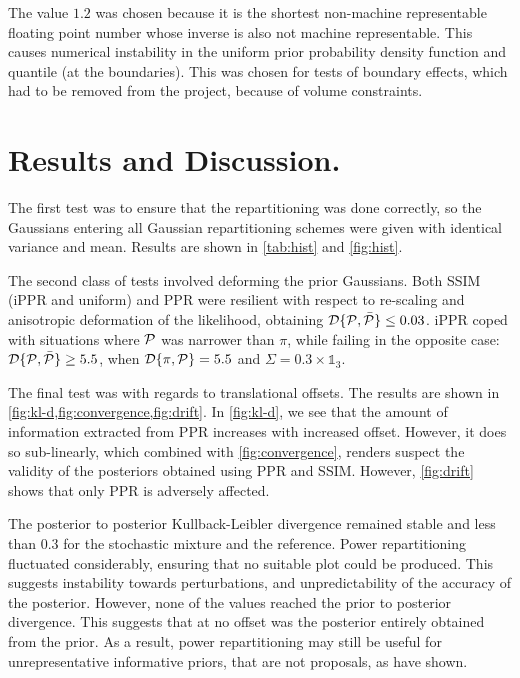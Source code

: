 \documentclass[usenatbib]{mnras}
\begin{document}
The value \(1.2\) was chosen because it is the shortest non-machine
representable floating point number whose inverse is also not machine
representable. This causes numerical instability in the uniform prior
probability density function and quantile (at the boundaries). This
was chosen for tests of boundary effects, which had to be removed from
the project, because of volume constraints. 

\section{Results and Discussion.}\label{sec:results}
The first test was to ensure that the repartitioning was done
correctly, so the Gaussians entering all Gaussian repartitioning
schemes were given with identical variance and mean. Results are shown
in \cref{tab:hist} and \cref{fig:hist}.


The second class of tests involved deforming the prior Gaussians.
Both SSIM (iPPR and uniform) and PPR were resilient with respect to
re-scaling and anisotropic deformation of the likelihood, obtaining
${\cal D}\{ {\cal P}, \bar{\cal P}\} \leq 0.03$. iPPR coped with
situations where ${\cal P}$ was narrower than $\pi$, while failing in
the opposite case: ${\cal D}\{ {\cal P}, \bar{\cal P}\} \geq 5.5$,
when ${\cal D}\{ \pi, {\cal P} \} = 5.5$ and
$\Sigma = 0.3 \times \mathds{1}_{3}$.

The final test was with regards to translational offsets. The results
are shown in \cref{fig:kl-d,fig:convergence,fig:drift}. In
\cref{fig:kl-d}, we see that the amount of information extracted from
PPR increases with increased offset. However, it does so sub-linearly,
which combined with \cref{fig:convergence}, renders suspect the
validity of the posteriors obtained using PPR and SSIM. However,
\cref{fig:drift} shows that only PPR is adversely affected.

The posterior to posterior Kullback-Leibler divergence remained stable
and less than \(0.3\) for the stochastic mixture and the
reference. Power repartitioning fluctuated considerably, ensuring that
no suitable plot could be produced. This suggests instability towards
perturbations, and unpredictability of the accuracy of the
posterior. However, none of the values reached the prior to posterior
divergence. This suggests that at no offset was the posterior entirely
obtained from the prior. As a result, power repartitioning may still
be useful for unrepresentative informative priors, that are not
proposals, as \cite{chen-ferroz-hobson} have shown. 
\end{document}
